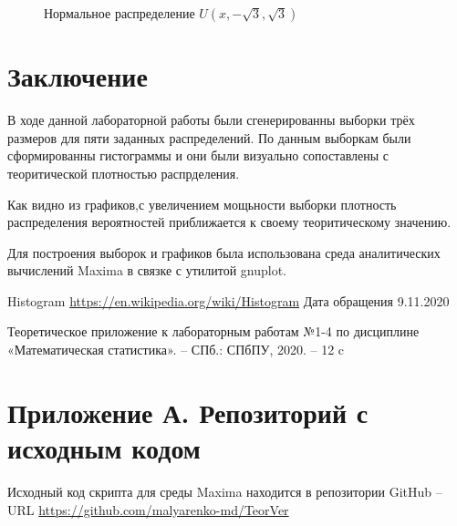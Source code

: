 \documentclass[12pt]{article}
\begin{document}
\begin{flushleft}
\begin{figure}[h!]
\begin{minipage}[h]{0.325\linewidth}
        \end{minipage}
        \caption{Нормальное распределение $U(x, -\sqrt{3}, \sqrt{3})$}
    \end{figure}

\newpage

\section*{Заключение}

В ходе данной лабораторной работы были сгенерированны выборки трёх размеров для пяти заданных распределений. По данным выборкам были сформированны гистограммы и они были визуально сопоставлены с теоритической плотностью распрделения.

Как видно из графиков,с увеличением мощьности выборки плотность распределения вероятностей приближается к своему теоритическому значению.

Для построения выборок и графиков была использована среда аналитических вычислений Maxima в связке с утилитой gnuplot.

\newpage


\begin{thebibliography}{9}
        Histogram \url{https://en.wikipedia.org/wiki/Histogram} Дата обращения 9.11.2020
    
        Теоретическое приложение к лабораторным работам №1-4 по дисциплине «Математическая статистика». -- СПб.: СПбПУ, 2020. -- 12 c 
	
\end{thebibliography}

\newpage

\section*{Приложение А. Репозиторий с исходным кодом}

Исходный код скрипта для среды Maxima находится в репозитории GitHub -- URL \url{https://github.com/malyarenko-md/TeorVer}

\end{flushleft}
\end{document}
